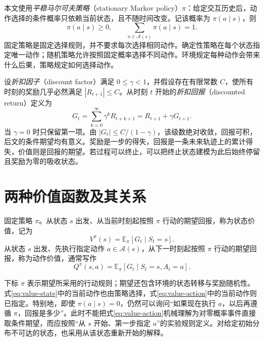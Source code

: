 \documentclass[UTF8,12pt,a4paper,fontset=fandol]{ctexart}
\begin{document}
本文使用\emph{平稳马尔可夫策略}（stationary Markov policy）$\pi$：给定交互历史后，动作选择的条件概率只依赖当前状态，且不随时间改变。记该概率为 $\pi(a\mid s)$，则
\[
  \pi(a\mid s)\geq0,\qquad
  \sum_{a\in\mathcal A(s)}\pi(a\mid s)=1.
\]
固定策略是固定选择规则，并不要求每次选择相同动作。确定性策略在每个状态指定唯一动作；随机策略允许按照固定概率选择不同动作。环境规定每种动作会带来什么后果，策略规定如何选择动作。

设\emph{折扣因子}（discount factor）满足 $0\leq\gamma<1$，并假设存在有限常数 $C$，使所有时刻的奖励几乎必然满足 $|R_{t+1}|\leq C$。从时刻 $t$ 开始的\emph{折扣回报}（discounted return）定义为
\begin{equation}
  G_t=\sum_{k=0}^{\infty}\gamma^kR_{t+k+1}
     =R_{t+1}+\gamma G_{t+1}.
  \label{eq:value-return}
\end{equation}
当 $\gamma=0$ 时只保留第一项。由 $|G_t|\leq C/(1-\gamma)$，该级数绝对收敛，回报可积，后文的条件期望均有意义。奖励是一步的得失，回报是一条未来轨迹上的累计得失，价值则是回报的期望。若过程可以终止，可以把终止状态建模为此后始终停留且奖励为零的吸收状态。

\section{两种价值函数及其关系}
\label{sec:value-functions}

\begin{definition}[状态价值与动作价值]
固定策略 $\pi$。从状态 $s$ 出发、从当前时刻起按照 $\pi$ 行动的期望回报，称为状态价值，记为
\begin{equation}
  V^\pi(s)=\mathbb E_\pi[G_t\mid S_t=s].
  \label{eq:value-state}
\end{equation}
从状态 $s$ 出发、先执行指定动作 $a\in\mathcal A(s)$，从下一时刻起按照 $\pi$ 行动的期望回报，称为动作价值，通常写作
\begin{equation}
  Q^\pi(s,a)=\mathbb E_\pi[G_t\mid S_t=s,A_t=a].
  \label{eq:value-action}
\end{equation}
\end{definition}

下标 $\pi$ 表示期望所采用的行动规则；期望还包含环境的状态转移与奖励随机性。式\eqref{eq:value-state}中的当前动作也由策略选择，式\eqref{eq:value-action}中的当前动作则已指定。特别地，即使 $\pi(a\mid s)=0$，仍然可以询问“如果现在执行 $a$，以后再遵循 $\pi$，回报是多少”。此时不能把式\eqref{eq:value-action}机械理解为对零概率事件直接取条件期望，而应按照“从 $s$ 开始、第一步指定 $a$”的实验规则定义。对给定初始分布不可达的状态，也采用从该状态重新开始的解释。
\end{document}
